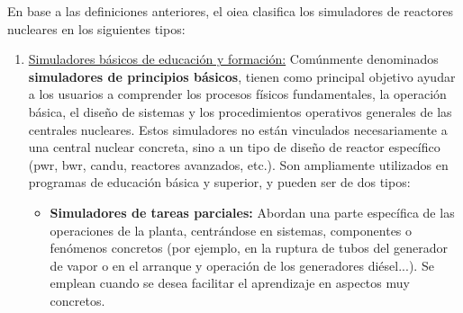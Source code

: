 En base a las definiciones anteriores, el \acrshort{oiea} clasifica los simuladores de reactores nucleares en los siguientes tipos:

\begin{enumerate}
  \item \underline{Simuladores básicos de educación y formación:} Comúnmente denominados \textbf{simuladores de principios básicos}, tienen como principal objetivo ayudar a los usuarios a comprender los procesos físicos fundamentales, la operación básica, el diseño de sistemas y los procedimientos operativos generales de las centrales nucleares. Estos simuladores no están vinculados necesariamente a una central nuclear concreta, sino a un tipo de diseño de reactor específico (\acrshort{pwr}, \acrshort{bwr}, \acrfull{candu}, reactores avanzados, etc.). Son ampliamente utilizados en programas de educación básica y superior, y pueden ser de dos tipos:
  \begin{itemize}
    \item \textbf{Simuladores de tareas parciales:} Abordan una parte específica de las operaciones de la planta, centrándose en sistemas, componentes o fenómenos concretos (por ejemplo, en la ruptura de tubos del generador de vapor o en el arranque y operación de los generadores diésel...). Se emplean cuando se desea facilitar el aprendizaje en aspectos muy concretos.
    

\end{itemize}
\end{enumerate}
